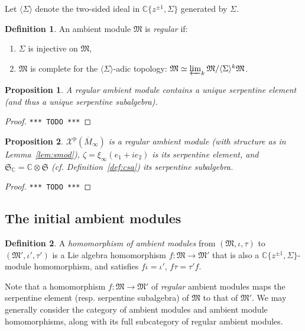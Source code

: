 \documentclass{article}
\def\MISS{\texttt{*** TODO ***}}
\def\fM{\mathfrak{M}}
\def\fS{\mathfrak{S}}
\def\CC{\mathbb{C}}
\def\XX{\mathcal{X}}
\def\inv{\tau} %
\def\p{\mathrm{p}}
\newtheorem{prop}{Proposition}
\theoremstyle{definition}
\newtheorem{defn}{Definition}
\begin{document}
Let $\langle \Sigma\rangle$ denote the two-sided
ideal in $\CC\{z^{\pm1},\Sigma\}$ generated by $\Sigma$.
\begin{defn}
An ambient module $\fM$ is \emph{regular} if:
\begin{enumerate}
        \item $\Sigma$ is injective on $\fM$,
        \item $\fM$ is complete for the $\langle\Sigma\rangle$-adic topology:
$\fM \simeq \varprojlim_k \fM / \langle\Sigma\rangle^k\fM$.
\end{enumerate}
\end{defn}

\begin{prop}
        A regular ambient module contains a unique serpentine element (and thus a unique serpentine subalgebra).
\end{prop}
\begin{proof}\MISS\end{proof}

\begin{prop}
        $\XX^\p(\overline M_\infty)$ is a regular ambient module (with structure as in Lemma~\ref{lem:smod}),
        $\zeta = \xi_\infty(e_1+ie_2)$ is its serpentine element,
        and $\fS_\CC = \CC\otimes\fS$ (cf. Definition~\ref{def:csa}) its serpentine subalgebra. 
\end{prop}
\begin{proof}\MISS\end{proof}

\subsection{The initial ambient modules}
\begin{defn}
        A \emph{homomorphism of ambient modules}
        from $(\fM,\iota,\inv)$ to $(\fM',\iota',\inv')$
        is a Lie algebra homomorphism $f : \fM \to \fM'$ that is also
        a $\CC\{z^{\pm1},\Sigma\}$-module homomorphism, and satisfies
        $f\iota=\iota'$, $f\inv=\inv'f$.
\end{defn}

Note that a homomorphism $f:\fM\to\fM'$ of \emph{regular} ambient modules
maps the serpentine element (resp. serpentine subalgebra) of $\fM$ to
that of $\fM'$. We may generally consider the category of ambient modules
and ambient module homomorphisms, along with its full subcategory of regular
ambient modules.
\end{document}
